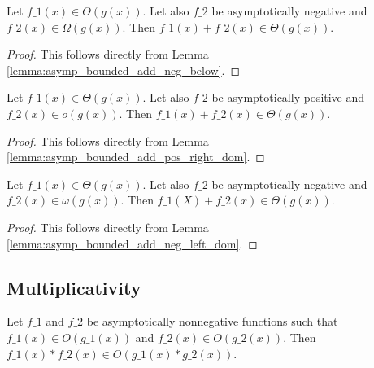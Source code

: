 \begin{lemma}
    \label{lemma:theta_add_neg_Omega}
    \leanok
    Let $f\_1(x) \in \Theta(g(x))$. Let also $f\_2$ be asymptotically negative
    and $f\_2(x) \in \Omega(g(x))$. Then $f\_1(x) + f\_2(x) \in \Theta(g(x))$.
\end{lemma}

\begin{proof}
    \leanok
    This follows directly from Lemma \ref{lemma:asymp_bounded_add_neg_below}.
\end{proof}

\begin{lemma}
    \label{lemma:theta_add_pos_o}
    \leanok
    Let $f\_1(x) \in \Theta(g(x))$. Let also $f\_2$ be asymptotically positive and
    $f\_2(x) \in o(g(x))$. Then $f\_1(x) + f\_2(x) \in \Theta(g(x))$.
\end{lemma}

\begin{proof}
    \leanok
    This follows directly from Lemma \ref{lemma:asymp_bounded_add_pos_right_dom}.
\end{proof}

\begin{theorem}
    \label{thm:theta_add_neg_omega}
    \leanok
    Let $f\_1(x) \in \Theta(g(x))$. Let also $f\_2$ be asymptotically negative and
    $f\_2(x) \in \omega(g(x))$. Then $f\_1(X) + f\_2(x) \in \Theta(g(x))$.
\end{theorem}

\begin{proof}
    \leanok
    This follows directly from Lemma \ref{lemma:asymp_bounded_add_neg_left_dom}.
\end{proof}


\subsection{Multiplicativity}

\begin{lemma}
    \label{lemma:O_nonneg_mul}
    \leanok
    Let $f\_1$ and $f\_2$ be asymptotically nonnegative functions such that 
    $f\_1(x) \in O(g\_1(x))$ and $f\_2(x) \in O(g\_2(x))$. Then 
    $f\_1(x) * f\_2(x) \in O(g\_1(x) * g\_2(x))$.
\end{lemma}

